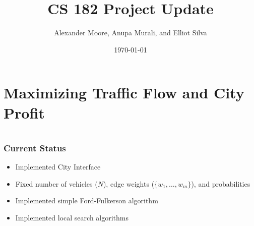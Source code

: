 \documentclass[mathserif]{beamer}
\title{CS 182 Project Update}
\author{Alexander Moore, Anupa Murali, and Elliot Silva}
\date{\today}
\begin{document}
\frame{\titlepage}
\section{ Maximizing Traffic Flow and City Profit}
\frame{\tableofcontents}

\section{}
\frame
{
  \frametitle{Current Status}
\vspace{-0.6in}
  \begin{itemize}
  \item<1->  Implemented City Interface
  \item<2-> Fixed number of vehicles ($N$), edge weights ($\{w_1,\ldots,w_m\}$), and probabilities
  \item<3-> Implemented simple Ford-Fulkerson algorithm
  \item<4-> Implemented local search algorithms
  \end{itemize}
}
\end{document}
